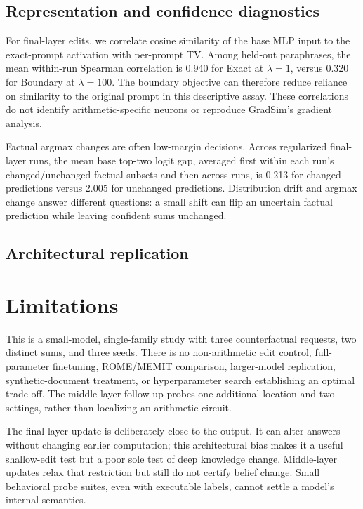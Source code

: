 \documentclass[10pt,twocolumn]{article}
\begin{document}
\subsection{Representation and confidence diagnostics}
For final-layer edits, we correlate cosine similarity of the base MLP input to the exact-prompt activation with per-prompt TV. Among held-out paraphrases, the mean within-run Spearman correlation is 0.940 for Exact at $\lambda=1$, versus 0.320 for Boundary at $\lambda=100$. The boundary objective can therefore reduce reliance on similarity to the original prompt in this descriptive assay. These correlations do not identify arithmetic-specific neurons or reproduce GradSim's gradient analysis.

Factual argmax changes are often low-margin decisions. Across regularized final-layer runs, the mean base top-two logit gap, averaged first within each run's changed/unchanged factual subsets and then across runs, is 0.213 for changed predictions versus 2.005 for unchanged predictions. Distribution drift and argmax change answer different questions: a small shift can flip an uncertain factual prediction while leaving confident sums unchanged.

\subsection{Architectural replication}


\section{Limitations}
This is a small-model, single-family study with three counterfactual requests, two distinct sums, and three seeds. There is no non-arithmetic edit control, full-parameter finetuning, ROME/MEMIT comparison, larger-model replication, synthetic-document treatment, or hyperparameter search establishing an optimal trade-off. The middle-layer follow-up probes one additional location and two settings, rather than localizing an arithmetic circuit.

The final-layer update is deliberately close to the output. It can alter answers without changing earlier computation; this architectural bias makes it a useful shallow-edit test but a poor sole test of deep knowledge change. Middle-layer updates relax that restriction but still do not certify belief change. Small behavioral probe suites, even with executable labels, cannot settle a model's internal semantics.
\end{document}
